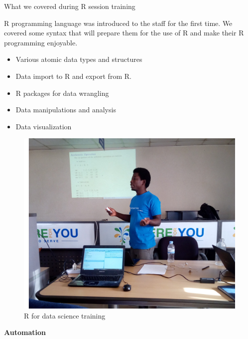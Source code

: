 \documentclass[ignorenonframetext,]{beamer}
\providecommand{\tightlist}{%
  \setlength{\itemsep}{0pt}\setlength{\parskip}{0pt}}
\begin{document}
\begin{frame}{What we covered during R session training}
\protect\hypertarget{what-we-covered-during-r-session-training}{}

R programming language was introduced to the staff for the first time.
We covered some syntax that will prepare them for the use of R and make
their R programming enjoyable.

\begin{itemize}
\tightlist
\item
  Various atomic data types and structures
\item
  Data import to R and export from R.
\item
  R packages for data wrangling
\item
  Data manipulations and analysis
\item
  Data visualization
\end{itemize}

\end{frame}

\begin{frame}

\begin{figure}
\centering
\includegraphics{Images/training_2.jpg}
\caption{R for data science training}
\end{figure}

\end{frame}

\begin{frame}

\begin{center}
\textbf{Automation}
\end{center}

\end{frame}
\end{document}
